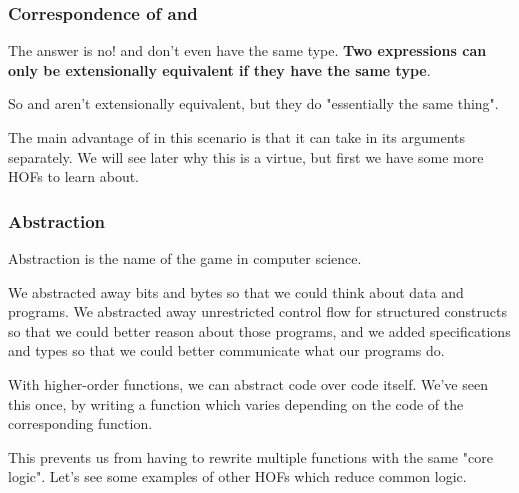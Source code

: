 \documentclass[aspectratio=169, handout]{beamer}
\begin{document}
\begin{frame}[fragile]
  \frametitle{Correspondence of  and }

  The answer is no!  and  don't even have the same type.
  \textbf{Two expressions can only be extensionally equivalent if they have the same type}.

  \pause
  \vspace{\fill}

  So  and  aren't extensionally equivalent, but they do
  "essentially the same thing".

  \pause
  \vspace{\fill}

  The main advantage of  in this scenario is that it can take in its
  arguments separately. We will see later why this is a virtue, but first we have
  some more HOFs to learn about.
\end{frame}



\begin{frame}[fragile]
  \frametitle{Abstraction}

  Abstraction is the name of the game in computer science.

  \pause
  \vspace{\fill}

  We abstracted away bits and bytes so that we could think about data and programs.
  We abstracted away unrestricted control flow for structured constructs so that
  we could better reason about those programs, and we added specifications and types
  so that we could better communicate what our programs do.

  \pause
  \vspace{\fill}

  With higher-order functions, we can abstract code over code itself. We've seen this
  once, by writing a  function which varies depending on the code of the
  corresponding  function.

  \pause
  \vspace{\fill}

  This prevents us from having to rewrite multiple  functions with the
  same "core logic". Let's see some examples of other HOFs which reduce common logic.
\end{frame}
\end{document}

